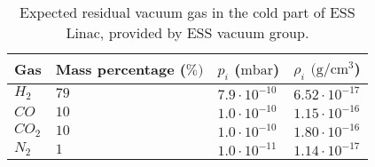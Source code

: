 \begin{table}[ht]
	\centering
	\caption[Expected residual vacuum gas in the cold part of ESS Linac, provided by ESS vacuum group]
	{Expected residual vacuum gas in the cold part of ESS Linac, provided by ESS vacuum group.}
	\label{chap3:ess_vacuum_gas}
	\begin{tabular}{llll}
		\toprule
		Gas        & Mass percentage (\(\%)\) & $p_{i}$ (\(\mathrm{mbar}\)) & $\rho_{i}$ $(\mathrm{g/cm^{3}}$) \\
		\midrule
		\(H_{2}\)  & \(79\)                   & \(7.9\cdot10^{-10}\)        & \(6.52\cdot
		10^{-17}\)                                                                                             \\
		\(CO\)     & \(10\)                   & \(1.0\cdot10^{-10}\)        & \(1.15\cdot
		10^{-16}\)                                                                                             \\
		\(CO_{2}\) & \(10\)                   & \(1.0\cdot10^{-10}\)        & \(1.80\cdot
		10^{-16}\)                                                                                             \\
		\(N_{2}\)  & \(1\)                    & \(1.0\cdot10^{-11}\)        & \(1.14\cdot
		10^{-17}\)                                                                                             \\
		\bottomrule
	\end{tabular}
\end{table}